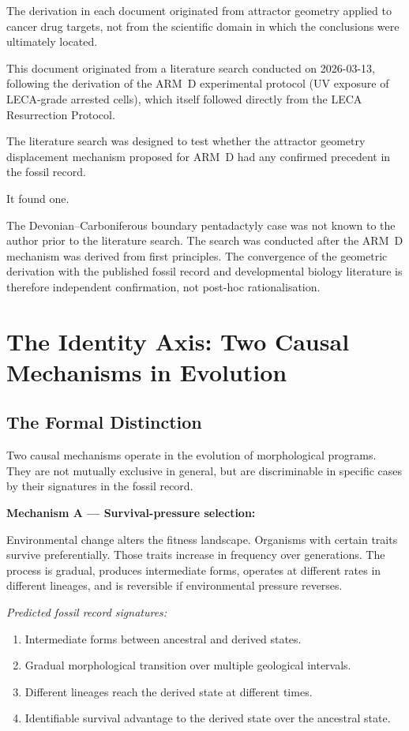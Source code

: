 \documentclass[11pt, a4paper]{article}
\begin{document}
The derivation in each document originated from
attractor geometry applied to cancer drug targets,
not from the scientific domain in which the
conclusions were ultimately located.

This document originated from a literature search
conducted on 2026-03-13, following the derivation
of the ARM~D experimental protocol (UV exposure of
LECA-grade arrested cells), which itself followed
directly from the LECA Resurrection Protocol.

The literature search was designed to test whether
the attractor geometry displacement mechanism
proposed for ARM~D had any confirmed precedent in
the fossil record.

It found one.

The Devonian--Carboniferous boundary pentadactyly
case was not known to the author prior to the
literature search.
The search was conducted after the ARM~D mechanism
was derived from first principles.
The convergence of the geometric derivation with
the published fossil record and developmental
biology literature is therefore independent
confirmation, not post-hoc rationalisation.

\section{The Identity Axis: Two Causal Mechanisms
in Evolution}

\subsection{The Formal Distinction}

Two causal mechanisms operate in the evolution of
morphological programs.
They are not mutually exclusive in general, but
are discriminable in specific cases by their
signatures in the fossil record.

\textbf{Mechanism A --- Survival-pressure selection:}

Environmental change alters the fitness landscape.
Organisms with certain traits survive preferentially.
Those traits increase in frequency over generations.
The process is gradual, produces intermediate forms,
operates at different rates in different lineages,
and is reversible if environmental pressure reverses.

\textit{Predicted fossil record signatures:}
\begin{enumerate}[leftmargin=*, label=(\alph*)]
\item Intermediate forms between ancestral and
  derived states.
\item Gradual morphological transition over
  multiple geological intervals.
\item Different lineages reach the derived state
  at different times.
\item Identifiable survival advantage to the
  derived state over the ancestral state.
\end{enumerate}
\end{document}

